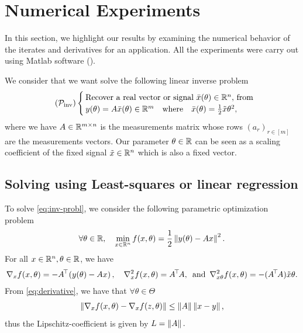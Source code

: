 \section{Numerical Experiments}\label{sec_numexp}
In this section, we highlight our results by examining the numerical behavior of the iterates and derivatives for an application. 
All the experiments were carry out using Matlab software (\cite{matlab22}). 

We consider that we want solve the following linear inverse problem 
\begin{equation}\label{eq:inv-probl}\tag{$\calP_{\mathrm{inv}}$}
\begin {cases}
\text{Recover a real vector or signal $\avx(\theta)\in \bbR^n,$  from }\\
y(\theta)= A\avx(\theta)\in \bbR^m \qwhereq \avx(\theta)=\frac{1}{2}\tilde{x}\theta^2, 
\end{cases}
\end{equation}
where we have $A\in \mathbb{R}^{m\times n}$ is the measurements matrix whose rows $(a_r)_{r\in[m]}$ are the measurements vectors.  Our parameter   $\theta\in\mathbb{R}$  can be seen as a scaling coefficient of the fixed signal  $\tilde{x}\in\mathbb{R}^n$ which is also a fixed vector.

\subsection{Solving using Least-squares or linear regression}\label{sec:least-square}
To solve \eqref{eq:inv-probl}, we consider the following parametric optimization problem  
\begin{equation}\label{eq:param-ls}
\forall \theta\in\mathbb{R}, \quad \min_{x\in\mathbb{R}^n}f(x,\theta)=\frac{1}{2}\left\Vert {y(\theta)-Ax} \right\Vert^2.
\end{equation}
 For all $ x\in\mathbb{R}^n, \theta\in\mathbb{R}$, we have 
\begin{align}\label{eq:derivative}
\nabla_x f(x,\theta)=-{A}^{\!\top\!}\left({y(\theta)-Ax}\right),\quad\nabla^2_x f(x,\theta)={A}^{\!\top\!}A,\enskip \text{and} \enskip\nabla^2_{x\theta} f(x,\theta)=-({A}^{\!\top\!}A)\tilde{x}\theta.
\end{align}
From \eqref{eq:derivative}, we have that $\forall \theta \in \Theta$ 
\begin{align}
\left\Vert {\nabla_x f(x,\theta)-\nabla_x f(z,\theta)} \right\Vert \leq \left\Vert {A} \right\Vert \left\Vert {x-y} \right\Vert,
\end{align}
thus the Lipschitz-coefficient is given by $L=\left\Vert {A} \right\Vert.$
 
